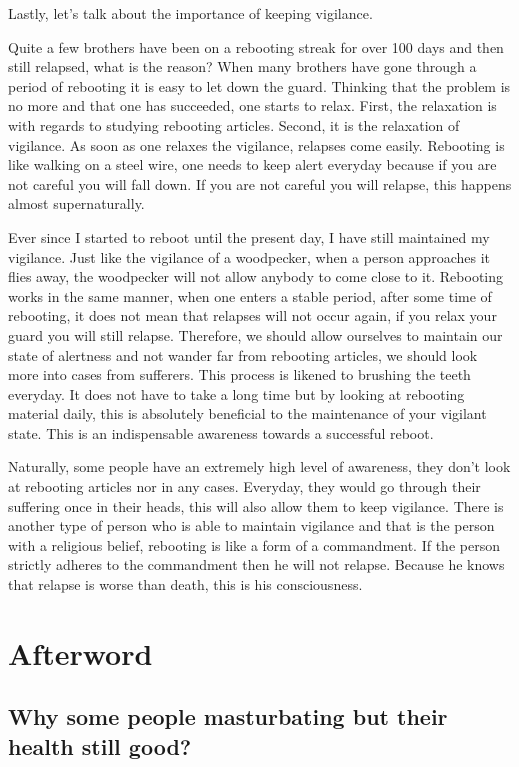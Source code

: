 \documentclass[
]{book}
\begin{document}
Lastly, let's talk about the importance of keeping vigilance.

Quite a few brothers have been on a rebooting streak for over 100 days and then still relapsed, what is the reason? When many brothers have gone through a period of rebooting it is easy to let down the guard. Thinking that the problem is no more and that one has succeeded, one starts to relax. First, the relaxation is with regards to studying rebooting articles. Second, it is the relaxation of vigilance. As soon as one relaxes the vigilance, relapses come easily. Rebooting is like walking on a steel wire, one needs to keep alert everyday because if you are not careful you will fall down. If you are not careful you will relapse, this happens almost supernaturally.

Ever since I started to reboot until the present day, I have still maintained my vigilance. Just like the vigilance of a woodpecker, when a person approaches it flies away, the woodpecker will not allow anybody to come close to it. Rebooting works in the same manner, when one enters a stable period, after some time of rebooting, it does not mean that relapses will not occur again, if you relax your guard you will still relapse. Therefore, we should allow ourselves to maintain our state of alertness and not wander far from rebooting articles, we should look more into cases from sufferers. This process is likened to brushing the teeth everyday. It does not have to take a long time but by looking at rebooting material daily, this is absolutely beneficial to the maintenance of your vigilant state. This is an indispensable awareness towards a successful reboot.

Naturally, some people have an extremely high level of awareness, they don't look at rebooting articles nor in any cases. Everyday, they would go through their suffering once in their heads, this will also allow them to keep vigilance. There is another type of person who is able to maintain vigilance and that is the person with a religious belief, rebooting is like a form of a commandment. If the person strictly adheres to the commandment then he will not relapse. Because he knows that relapse is worse than death, this is his consciousness.

\hypertarget{afterword-4}{%
\section{Afterword}\label{afterword-4}}

\hypertarget{why-some-people-masturbating-but-their-health-still-good}{%
\subsection{Why some people masturbating but their health still good?}\label{why-some-people-masturbating-but-their-health-still-good}}
\end{document}
